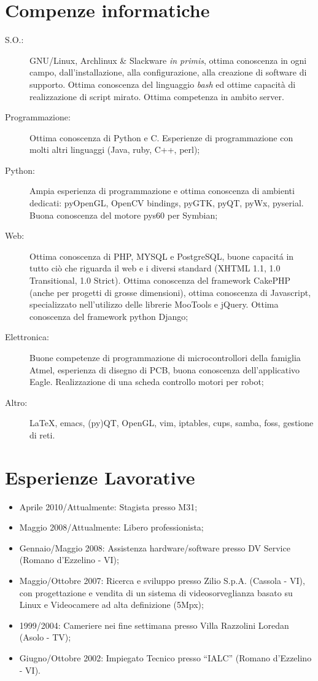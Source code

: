 \documentclass[pdftex, a4paper, 11pt]{article}
\begin{document}
\section*{Compenze informatiche}
\begin{description}
\item[S.O.:] GNU/Linux, Archlinux \& Slackware {\em in primis}, ottima conoscenza
  in ogni campo, dall'installazione, alla configurazione, alla
  creazione di software di supporto. Ottima conoscenza del linguaggio
  {\em bash} ed ottime capacit\`a di realizzazione di script
  mirato. Ottima competenza in ambito server.
\item[Programmazione:] Ottima conoscenza di Python e C. Esperienze di
  programmazione con molti altri linguaggi (Java,
  ruby, C++, perl);
\item[Python:] Ampia esperienza di programmazione e ottima conoscenza
  di ambienti dedicati: pyOpenGL, OpenCV bindings, pyGTK, pyQT, pyWx,
  pyserial. Buona conoscenza del motore pys60 per Symbian;
\item[Web:] Ottima conoscenza di PHP, MYSQL e PostgreSQL, buone capacit\'a in
  tutto ci\`o che riguarda il web e i diversi standard (XHTML 1.1,
  1.0 Transitional, 1.0 Strict). Ottima conoscenza del framework
  CakePHP (anche per progetti di grosse dimensioni), ottima conoscenza
  di Javascript, specializzato nell'utilizzo delle librerie MooTools e jQuery.
  Ottima conoscenza del framework python Django;
\item[Elettronica:] Buone competenze di programmazione di
  microcontrollori della famiglia Atmel, esperienza di disegno di PCB,
  buona conoscenza dell'applicativo Eagle. Realizzazione di una scheda
  controllo motori per robot;
\item[Altro:] \LaTeX, emacs, (py)QT, OpenGL, vim, iptables, cups,
  samba, foss, gestione di reti.
\end{description}

\section*{Esperienze Lavorative}
\begin{itemize}
\item Aprile 2010/Attualmente: Stagista presso M31;
\item Maggio 2008/Attualmente: Libero professionista;
\item Gennaio/Maggio 2008: Assistenza hardware/software presso DV
  Service (Romano d'Ezzelino - VI);
\item Maggio/Ottobre 2007: Ricerca e sviluppo presso Zilio
  S.p.A. (Cassola - VI), con progettazione e vendita di un sistema di
  videosorveglianza basato su Linux e Videocamere ad alta definizione
  (5Mpx);
\item 1999/2004: Cameriere nei fine settimana presso Villa Razzolini
  Loredan (Asolo - TV);
\item Giugno/Ottobre 2002: Impiegato Tecnico presso ``IALC'' (Romano
  d'Ezzelino - VI).
\end{itemize}
\end{document}
